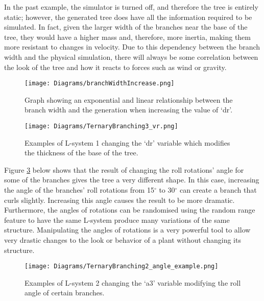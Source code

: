 In the past example, the simulator is turned off, and therefore the tree is entirely static; however, the generated tree does have all the information required to be simulated. In fact, given the larger width of the branches near the base of the tree, they would have a higher mass and, therefore, more inertia, making them more resistant to changes in velocity. Due to this dependency between the branch width and the physical simulation, there will always be some correlation between the look of the tree and how it reacts to forces such as wind or gravity.

\begin{figure}[htbp]
	{\centering
		\vspace{7px}
		\texttt{[image: Diagrams/branchWidthIncrease.png]}
		\caption{Graph showing an exponential and linear relationship between the branch width and the generation when increasing the value of `dr'.} \label{graph thickness}
	}
\end{figure}
\FloatBarrier

\begin{figure}[htbp]
	{\centering
		\vspace{7px}
		\texttt{[image: Diagrams/TernaryBranching3\_vr.png]} 
		\caption{Examples of L-system 1 changing the `dr' variable which modifies the thickness of the base of the tree.} \label{example thickness}
	}
\end{figure}
\FloatBarrier

\noindent
Figure \ref{example angle} below shows that the result of changing the roll rotations' angle for some of the branches gives the tree a very different shape. In this case, increasing the angle of the branches' roll rotations from 15$^\circ$ to 30$^\circ$ can create a branch that curls slightly. Increasing this angle causes the result to be more dramatic. Furthermore, the angles of rotations can be randomised using the random range feature to have the same L-system produce many variations of the same structure. Manipulating the angles of rotations is a very powerful tool to allow very drastic changes to the look or behavior of a plant without changing its structure. 

\begin{figure}[htbp]
	{\centering
		\vspace{7px}
		\texttt{[image: Diagrams/TernaryBranching2\_angle\_example.png]}
		\caption{Examples of L-system 2 changing the `a3' variable modifying the roll angle of certain branches.} \label{example angle}
	}
\end{figure}
\FloatBarrier

